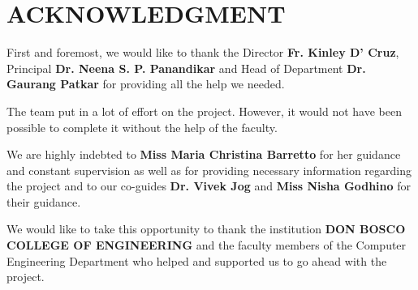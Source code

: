 \chapter*{ACKNOWLEDGMENT}

First and foremost, we would like to thank the Director \textbf{Fr. Kinley D’ Cruz}, 
Principal \textbf{Dr. Neena S. P. Panandikar} and Head of Department \textbf{Dr. Gaurang Patkar} 
for providing all the help we needed.

The team put in a lot of effort on the project. However, it would not have 
been possible to complete it without the help of the faculty.

We are highly indebted to \textbf{Miss Maria Christina Barretto} for her guidance 
and constant supervision as well as for providing necessary information 
regarding the project and to our co-guides \textbf{Dr. Vivek Jog} and \textbf{Miss Nisha 
Godhino} for their guidance.

We would like to take this opportunity to thank the institution 
\textbf{DON BOSCO COLLEGE OF ENGINEERING} and the faculty members of the 
Computer Engineering Department who helped and supported us to 
go ahead with the project.
